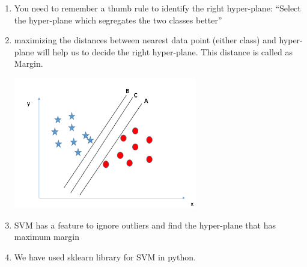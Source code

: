 \documentclass[journal]{IEEEtran}
\begin{document}
	\begin{enumerate}
		\item You need to remember a thumb rule to identify the right hyper-plane: “Select the hyper-plane which segregates the two classes better”
		\item  maximizing the distances between nearest data point (either class) and hyper-plane will help us to decide the right hyper-plane. This distance is called as Margin.
		\begin{minipage}{\linewidth}
			\centering
			\includegraphics[width = 80mm]{svm2.png}
		\end{minipage} 
		\item SVM has a feature to ignore outliers and find the hyper-plane that has maximum margin
		\item We have used sklearn library for SVM in python.
		
		
	\end{enumerate}	
	
\end{document}
